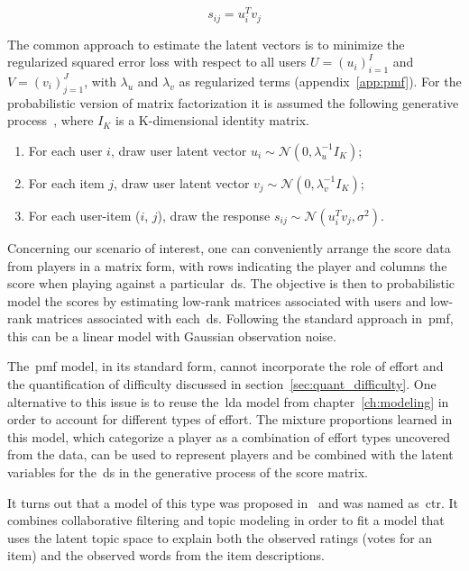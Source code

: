 \begin{equation}
    s_{ij} = u_{i}^{T}v_{j}
\end{equation}

The common approach to estimate the latent vectors is to minimize the regularized squared error loss with respect to all users $U=(u_{i})_{i=1}^{I}$ and $V=(v_{i})_{j=1}^{J}$, with $\lambda_{u}$ and $\lambda_{v}$ as regularized terms (appendix~\ref{app:pmf}). For the probabilistic version of matrix factorization it is assumed the following generative process~\citep{wang_collaborative_2011}, where $I_{K}$ is a K-dimensional identity matrix.

\begin{enumerate}
    \item For each user $i$, draw user latent vector $u_{i} \sim \mathcal{N}(0,\lambda_{u}^{-1}I_{K})$;
    \item For each item $j$, draw user latent vector $v_{j} \sim \mathcal{N}(0,\lambda_{v}^{-1}I_{K})$;
    \item For each user-item ($i$, $j$), draw the response $s_{ij} \sim \mathcal{N}(u_{i}^{T}v_{j}, \sigma^2)$.
\end{enumerate}


Concerning our scenario of interest, one can conveniently arrange the score data from players in a matrix form, with rows indicating the player and columns the score when playing against a particular~\gls{ds}. The objective is then to probabilistic model the scores by estimating low-rank matrices associated with users and low-rank matrices associated with each~\gls{ds}.
Following the standard approach in~\gls{pmf}, this can be a linear model with Gaussian observation noise. 

The~\gls{pmf} model, in its standard form, cannot incorporate the role of effort and the quantification of difficulty discussed in section~\ref{sec:quant_difficulty}. One alternative to this issue is to reuse the~\gls{lda} model from chapter~\ref{ch:modeling} in order to account for different types of effort. The mixture proportions learned in this model, which categorize a player as a combination of effort types uncovered from the data, can be used to represent players and be combined with the latent variables for the~\gls{ds} in the generative process of the score matrix.

It turns out that a model of this type was proposed in~\cite{wang_collaborative_2011} and was named as~\gls{ctr}. It combines collaborative filtering and topic modeling in order to fit a model that uses the latent topic space to explain both the observed ratings (votes for an item) and the observed words from the item descriptions. 

